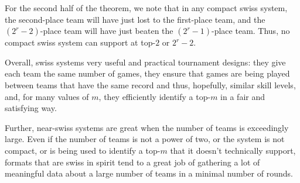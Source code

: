 {{        For the second half of the theorem, we note that in any compact swiss system, the second-place team will have just lost to the first-place team, and the $(2^r-2)$-place team will have just beaten the $(2^r-1)$-place team. Thus, no compact swiss system can support at top-$2 $ or $2^r-2.$
    }{}

    Overall, swiss systems very useful and practical tournament designs: they give each team the same number of games, they ensure that games are being played between teams that have the same record and thus, hopefully, similar skill levels, and, for many values of $m$, they efficiently identify a top-$m$ in a fair and satisfying way.

    Further, near-swiss systems are great when the number of teams is exceedingly large. Even if the number of teams is not a power of two, or the system is not compact, or is being used to identify a top-$m$ that it doesn't technically support, formats that are swiss in spirit tend to a great job of gathering a lot of meaningful data about a large number of teams in a minimal number of rounds.
}